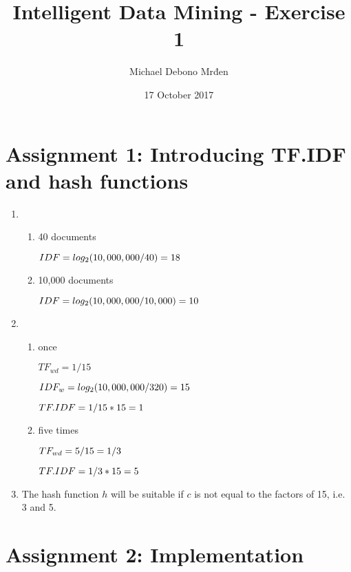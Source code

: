 \documentclass{article}
\title{Intelligent Data Mining - Exercise 1}
\author{Michael Debono Mrđen}
\date{17 October 2017}
\begin{document}
\maketitle

\section{Assignment 1: Introducing TF.IDF and hash functions}
\renewcommand{\labelenumi}{\alph{enumi}.}
\renewcommand{\labelenumii}{(\alph{enumii})}
\begin{enumerate}
\item
\begin{enumerate}
\item{40 documents

$IDF \\ = log_2(10,000,000/40) \\ = 18$}

\item{10,000 documents

$IDF \\ = log_2(10,000,000/10,000) \\ = 10$}
\end{enumerate}
\item
\begin{enumerate}
\item{once

$TF_{wd} = 1/15$

$IDF_w = log_2(10,000,000/320) \\ = 15$

$TF.IDF = 1/15 * 15 \\ = 1$}

\item{five times

$TF_{wd} = 5/15 \\ = 1/3$

$TF.IDF = 1/3 * 15 \\ = 5$}
\end{enumerate}
\item{The hash function $h$ will be suitable if $c$ is not equal to the factors of 15, i.e. 3 and 5.}
\end{enumerate}
\section{Assignment 2: Implementation}
\end{document}
